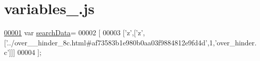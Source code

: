 \hypertarget{variables__19_8js_source}{}\section{variables\+\_.\+js}
\label{variables__19_8js_source}

\begin{DoxyCode}
\hypertarget{variables__19_8js_source.tex_l00001}{}\hyperlink{variables__19_8js_ad01a7523f103d6242ef9b0451861231e}{00001} var \hyperlink{variables__19_8js_ad01a7523f103d6242ef9b0451861231e}{searchData}=
00002 [
00003   [\textcolor{charliteral}{'z'},[\textcolor{charliteral}{'z'},[\textcolor{stringliteral}{'../over\_\_hinder\_8c.html#af73583b1e980b0aa03f9884812e9fd4d'},1,\textcolor{stringliteral}{'over\_hinder.c'}]]]
00004 ];
\end{DoxyCode}
